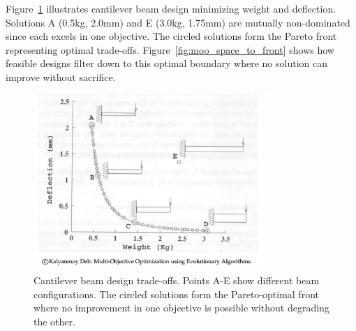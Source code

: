 \documentclass[journal,12pt,onecolumn]{IEEEtran}
\begin{document}
Figure~\ref{fig:pareto_dominance} illustrates cantilever beam design minimizing weight and deflection. Solutions A (0.5kg, 2.0mm) and E (3.0kg, 1.75mm) are mutually non-dominated since each excels in one objective. The circled solutions form the Pareto front representing optimal trade-offs. Figure~\ref{fig:moo_space_to_front} shows how feasible designs filter down to this optimal boundary where no solution can improve without sacrifice.

\begin{figure}[h]
\centering
\includegraphics[width=0.8\textwidth]{moo_pareto_dominance.png}
\caption{Cantilever beam design trade-offs. Points A-E show different beam configurations. The circled solutions form the Pareto-optimal front where no improvement in one objective is possible without degrading the other.}
\label{fig:pareto_dominance}
\end{figure}
\end{document}
